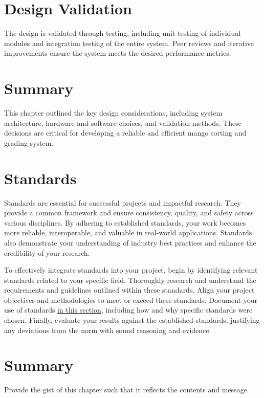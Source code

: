 \section{Design Validation}
The design is validated through testing, including unit testing of individual modules and integration testing of the entire system. Peer reviews and iterative improvements ensure the system meets the desired performance metrics.
\section{Summary}
This chapter outlined the key design considerations, including system architecture, hardware and software choices, and validation methods. These decisions are critical for developing a reliable and efficient mango sorting and grading system.


\graytx{\Blindtext}

\section{Standards}

Standards are essential for successful projects and impactful research. They provide a common framework and ensure consistency, quality, and safety across various disciplines. By adhering to established standards, your work becomes more reliable, interoperable, and valuable in real-world applications. Standards also demonstrate your understanding of industry best practices and enhance the credibility of your research.

To effectively integrate standards into your project, begin by identifying relevant standards related to your specific field. Thoroughly research and understand the requirements and guidelines outlined within these standards. Align your project objectives and methodologies to meet or exceed these standards. Document your use of standards \underline{in this section}, including how and why specific standards were chosen. Finally, evaluate your results against the established standards, justifying any deviations from the norm with sound reasoning and evidence.

\section{Summary}

Provide the gist of this chapter such that it reflects the contents and message.
